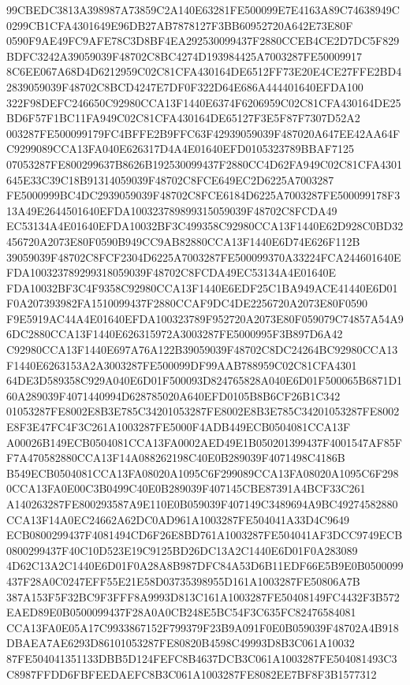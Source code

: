 \documentclass[UTF8,fontset=fandol,zihao=-4,a4paper]{ctexart}
\begin{document}
{{99CBEDC3813A398987A73859C2A140E63281FE500099E7E4163A89C74638949C0299CB1CFA4301649E96DB27AB7878127F3BB60952720A642E73E80F
0590F9AE49FC9AFE78C3D8BF4EA292530099437F2880CCEB4CE2D7DC5F829BDFC3242A39059039F48702C8BC4274D193984425A7003287FE50009917
8C6EE067A68D4D6212959C02C81CFA430164DE6512FF73E20E4CE27FFE2BD42839059039F48702C8BCD4247E7DF0F322D64E686A444401640EFDA100
322F98DEFC246650C92980CCA13F1440E6374F6206959C02C81CFA430164DE25BD6F57F1BC11FA949C02C81CFA430164DE65127F3E5F87F7307D52A2
003287FE500099179FC4BFFE2B9FFC63F42939059039F487020A647EE42AA64FC9299089CCA13FA040E626317D4A4E01640EFD0105323789BBAF7125
07053287FE800299637B8626B192530099437F2880CC4D62FA949C02C81CFA4301645E33C39C18B91314059039F48702C8FCE649EC2D6225A7003287
FE5000999BC4DC2939059039F48702C8FCE6184D6225A7003287FE500099178F313A49E2644501640EFDA100323789899315059039F48702C8FCDA49
EC53134A4E01640EFDA10032BF3C499358C92980CCA13F1440E62D928C0BD32456720A2073E80F0590B949CC9AB82880CCA13F1440E6D74E626F112B
39059039F48702C8FCF2304D6225A7003287FE500099370A33224FCA244601640EFDA100323789299318059039F48702C8FCDA49EC53134A4E01640E
FDA10032BF3C4F9358C92980CCA13F1440E6EDF25C1BA949ACE41440E6D01F0A207393982FA1510099437F2880CCAF9DC4DE2256720A2073E80F0590
F9E5919AC44A4E01640EFDA100323789F952720A2073E80F059079C74857A54A96DC2880CCA13F1440E626315972A3003287FE5000995F3B897D6A42
C92980CCA13F1440E697A76A122B39059039F48702C8DC24264BC92980CCA13F1440E6263153A2A3003287FE500099DF99AAB788959C02C81CFA4301
64DE3D589358C929A040E6D01F500093D824765828A040E6D01F500065B6871D160A289039F4071440994D628785020A640EFD0105B8B6CF26B1C342
01053287FE8002E8B3E785C34201053287FE8002E8B3E785C34201053287FE8002E8F3E47FC4F3C261A1003287FE5000F4ADB449ECB0504081CCA13F
A00026B149ECB0504081CCA13FA0002AED49E1B050201399437F4001547AF85FF7A470582880CCA13F14A088262198C40E0B289039F4071498C4186B
B549ECB0504081CCA13FA08020A1095C6F299089CCA13FA08020A1095C6F2980CCA13FA0E00C3B0499C40E0B289039F407145CBE87391A4BCF33C261
A140263287FE800293587A9E110E0B059039F407149C3489694A9BC49274582880CCA13F14A0EC24662A62DC0AD961A1003287FE504041A33D4C9649
ECB0800299437F4081494CD6F26E8BD761A1003287FE504041AF3DCC9749ECB0800299437F40C10D523E19C9125BD26DC13A2C1440E6D01F0A283089
4D62C13A2C1440E6D01F0A28A8B987DFC84A53D6B11EDF66E5B9E0B0500099437F28A0C0247EFF55E21E58D03735398955D161A1003287FE50806A7B
387A153F5F32BC9F3FFF8A9993D813C161A1003287FE50408149FC4432F3B572EAED89E0B0500099437F28A0A0CB248E5BC54F3C635FC82476584081
CCA13FA0E05A17C9933867152F799379F23B9A091F0E0B059039F48702A4B918DBAEA7AE6293D86101053287FE80820B4598C49993D8B3C061A10032
87FE504041351133DBB5D124FEFC8B4637DCB3C061A1003287FE504081493C3C8987FFDD6FBFEEDAEFC8B3C061A1003287FE8082EE7BF8F3B1577312
}}
\end{document}
